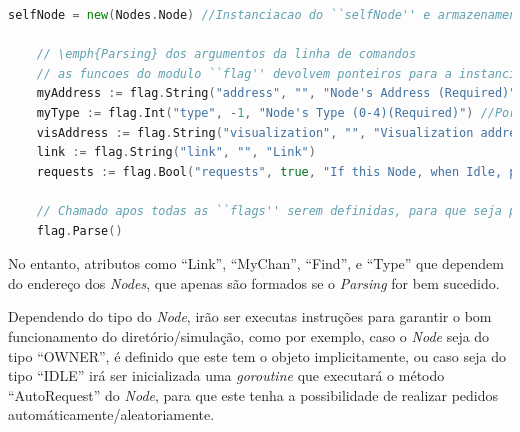 \begin{lstlisting}[caption={\emph{Parsing} dos argumentos da linha de comandos.},language=Go]
	selfNode = new(Nodes.Node) //Instanciacao do ``selfNode'' e armazenamento do ponteiro para o mesmo

	// \emph{Parsing} dos argumentos da linha de comandos
	// as funcoes do modulo ``flag'' devolvem ponteiros para a instanciacao de cada argumento \emph{Parsed}
	myAddress := flag.String("address", "", "Node's Address (Required)")
	myType := flag.Int("type", -1, "Node's Type (0-4)(Required)") //Por definicao de todos os tipos
	visAddress := flag.String("visualization", "", "Visualization address.")
	link := flag.String("link", "", "Link")
	requests := flag.Bool("requests", true, "If this Node, when Idle, preforms Object Requests")

	// Chamado apos todas as ``flags'' serem definidas, para que seja processado o \emph{Parsing}
	flag.Parse()

\end{lstlisting}

No entanto, atributos como ``Link'', ``MyChan'', ``Find'', e ``Type'' que dependem do endereço dos \emph{Nodes},
que apenas são formados se o \emph{Parsing} for bem sucedido.

Dependendo do tipo do \emph{Node}, irão ser executas instruções para garantir o bom funcionamento do diretório/simulação,
como por exemplo, caso o \emph{Node} seja do tipo ``OWNER'', é definido que este tem o objeto implicitamente, ou
caso seja do tipo ``IDLE'' irá ser inicializada uma \emph{goroutine} que executará o método ``AutoRequest'' do \emph{Node},
para que este tenha a possibilidade de realizar pedidos automáticamente/aleatoriamente.

